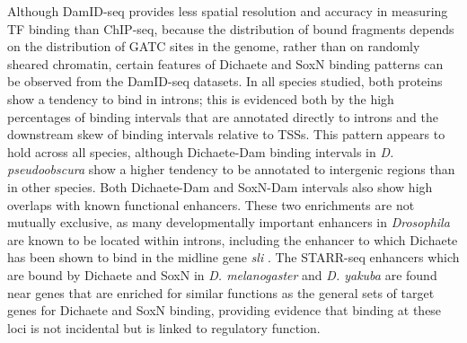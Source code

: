 Although DamID-seq provides less spatial resolution and accuracy in measuring TF binding than ChIP-seq, because the distribution of bound fragments depends on the distribution of GATC sites in the genome, rather than on randomly sheared chromatin, certain features of Dichaete and SoxN binding patterns can be observed from the DamID-seq datasets. In all species studied, both proteins show a tendency to bind in introns; this is evidenced both by the high percentages of binding intervals that are annotated directly to introns and the downstream skew of binding intervals relative to TSSs. This pattern appears to hold across all species, although Dichaete-Dam binding intervals in \emph{D. pseudoobscura} show a higher tendency to be annotated to intergenic regions than in other species. Both Dichaete-Dam and SoxN-Dam intervals also show high overlaps with known functional enhancers. These two enrichments are not mutually exclusive, as many developmentally important enhancers in \emph{Drosophila} are known to be located within introns, including the enhancer to which Dichaete has been shown to bind in the midline gene \emph{sli} \citep{aleksic_role_2013,ma_functional_2000}. The STARR-seq enhancers which are bound by Dichaete and SoxN in \emph{D. melanogaster} and \emph{D. yakuba} are found near genes that are enriched for similar functions as the general sets of target genes for Dichaete and SoxN binding, providing evidence that binding at these loci is not incidental but is linked to regulatory function.\\


